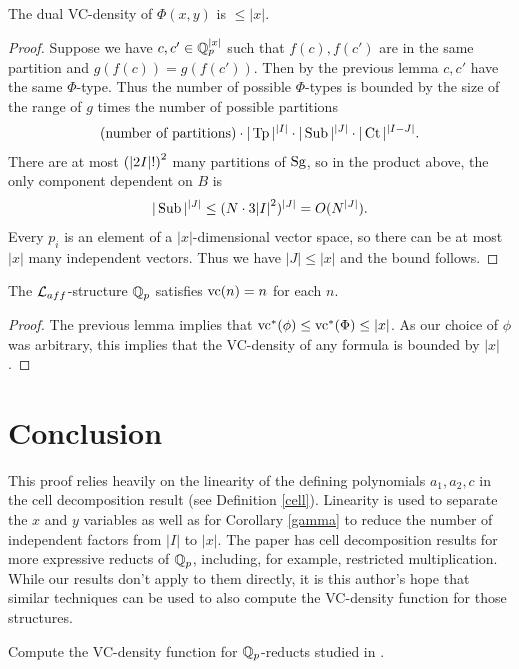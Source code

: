 \begin{Corollary}
  The dual VC-density of $\Phi(x,y)$ is $\leq |x|$.
\end{Corollary}

\begin{proof}
  Suppose we have $c, c' \in \mathbb{Q}_p^{|x|}$ such that $f(c), f(c')$ are in the same partition and $g(f(c)) = g(f(c'))$.
  Then by the previous lemma $c, c'$ have the same $\Phi$-type.
  Thus the number of possible $\Phi$-types is bounded by the size of the range of $g$ times the number of possible partitions
  \begin{align*}
    \text{(number of partitions)} \cdot |\operatorname{Tp}|^{|I|} \cdot |\operatorname{Sub}|^{|J|} \cdot |\operatorname{Ct}|^{|I-J|}.
  \end{align*}
  There are at most $\left(|2I|!\right)^2$ many partitions of $\operatorname{Sg}$,
  so in the product above, the only component dependent on $B$ is
  \begin{align*}
    |\operatorname{Sub}|^{|J|} \leq (N \cdot 3{|I|}^2)^{|J|} = O(N^{|J|}).
  \end{align*}	
  Every $p_i$ is an element of a $|x|$-dimensional vector space, so there can be at most $|x|$ many independent vectors.
  Thus we have $|J| \leq |x|$ and the bound follows.
\end{proof}

\begin{Corollary} 
  The $\mathcal L_{aff}$-structure $\mathbb{Q}_p$ satisfies $\operatorname{vc}(n) = n$ for each $n$.
\end{Corollary}

\begin{proof}
  The previous lemma implies that $\operatorname{vc}^*(\phi) \leq \operatorname{vc}^*(\Phi) \leq |x|$.
  As our choice of $\phi$ was arbitrary, this implies that the VC-density of any formula is bounded by $|x|$.
\end{proof}

\section{Conclusion}
This proof relies heavily on the linearity of the defining polynomials $a_1, a_2, c$ in the cell decomposition result (see Definition \ref{cell}).
Linearity is used to separate the $x$ and $y$ variables as well as
for Corollary \ref{gamma} to reduce the number of independent factors from $|I|$ to $|x|$.
The paper \cite{reduct} has cell decomposition results for more expressive reducts of $\mathbb{Q}_p$,
including, for example, restricted multiplication.
While our results don't apply to them directly,
it is this author's hope that similar techniques can be used to also compute the VC-density function for those structures.
\begin{openq}
  Compute the VC-density function for $\mathbb{Q}_p$-reducts studied in \cite{reduct}.
\end{openq}

